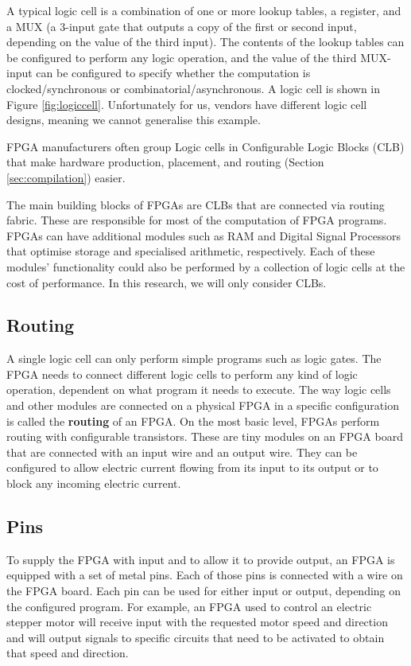 A typical logic cell is a combination of one or more lookup tables, a register, and a MUX (a 3-input gate that outputs a copy of the first or second input, depending on the value of the third input).  The contents of the lookup tables can be configured to perform any logic operation, and the value of the third MUX-input can be configured to specify whether the computation is clocked/synchronous or combinatorial/asynchronous. A logic cell is shown in Figure \ref{fig:logiccell}. Unfortunately for us, vendors have different logic cell designs, meaning we cannot generalise this example.

FPGA manufacturers often group Logic cells in Configurable Logic Blocks (CLB) that make hardware production, placement, and routing (Section \ref{sec:compilation}) easier.
 
The main building blocks of FPGAs are CLBs that are connected via routing fabric. These are responsible for most of the computation of FPGA programs. FPGAs can have additional modules such as RAM and Digital Signal Processors that optimise storage and specialised arithmetic, respectively. Each of these modules' functionality could also be performed by a collection of logic cells at the cost of performance. In this research, we will only consider CLBs.

\subsection{Routing}
A single logic cell can only perform simple programs such as logic gates. The FPGA needs to connect different logic cells to perform any kind of logic operation, dependent on what program it needs to execute. The way logic cells and other modules are connected on a physical FPGA in a specific configuration is called the \textbf{routing} of an FPGA. On the most basic level, FPGAs perform routing with configurable transistors. These are tiny modules on an FPGA board that are connected with an input wire and an output wire. They can be configured to allow electric current flowing from its input to its output or to block any incoming electric current.

\subsection{Pins}
To supply the FPGA with input and to allow it to provide output, an FPGA is equipped with a set of metal pins. Each of those pins is connected with a wire on the FPGA board. Each pin can be used for either input or output, depending on the configured program. For example, an FPGA used to control an electric stepper motor will receive input with the requested motor speed and direction and will output signals to specific circuits that need to be activated to obtain that speed and direction.




